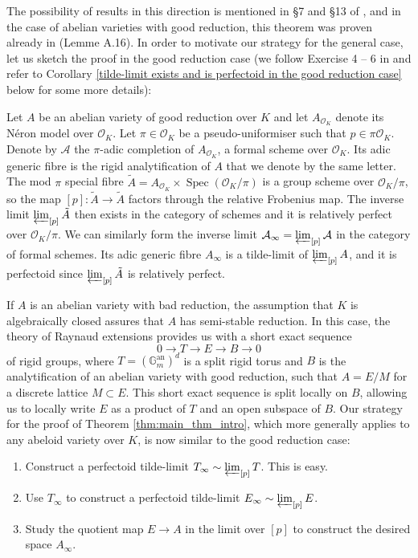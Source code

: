 \documentclass[10pt,oneside]{amsart}
\theoremstyle{definition}
\newcommand{\Spec}{\operatorname{Spec}}
\renewcommand{\O}{\mathcal{O}}
\begin{document}
The possibility of results in this direction is mentioned in \S 7 and \S 13 of \cite{scholzeICMproceedings}, and in the case of abelian varieties with good reduction, this theorem was proven already in \cite{Pilloni-Stroh} (Lemme A.16).  In order to motivate our strategy for the general case, let us sketch the proof in the good reduction case (we follow Exercise 4 -- 6 in \cite{Bhatt} and refer to Corollary \ref{tilde-limit exists and is perfectoid in the good reduction case} below for some more details):

Let $A$ be an abelian variety of good reduction over $K$ and let $A_{\mathcal O_K}$ denote its N\'eron model over $\mathcal O_K$. Let $\pi\in\mathcal O_K$ be a pseudo-uniformiser such that $p\in \pi\mathcal O_K$. Denote by $\mathcal A$ the $\pi$-adic completion of $A_{\mathcal O_K}$, a formal scheme over $\mathcal O_K$. Its adic generic fibre is the rigid analytification of $A$ that we denote by the same letter. The mod $\pi$ special fibre $\tilde{A} = A_{\mathcal O_K}\times \Spec(\O_K/\pi)$ is a group scheme over $\mathcal O_K/\pi$, so the map $[p]\colon\tilde{A}\rightarrow \tilde{A}$ factors through the relative Frobenius map. The inverse limit $ \varprojlim_{[p]} \tilde{A} $ then exists in the category of schemes and it is relatively perfect over $\mathcal O_K/\pi$. We can similarly form the inverse limit $\mathcal A_{\infty} = \varprojlim_{[p]} \mathcal A$ in the category of formal schemes. Its adic generic fibre $A_\infty$ is a tilde-limit of $\varprojlim_{[p]}A$, and it is perfectoid since $ \varprojlim_{[p]} \tilde{A} $ is relatively perfect.

If $A$ is an abelian variety with bad reduction, the assumption that $K$ is algebraically closed assures that $A$ has semi-stable reduction.
In this case, the theory of Raynaud extensions provides us with a short exact sequence 
\[ 0 \rightarrow T \rightarrow E  \rightarrow  B  \rightarrow  0\]
of rigid groups, where $T = (\mathbb G_m^{\text{an}})^{d}$ is a split rigid torus and $B$ is the analytification of an abelian variety with good reduction, such that $A = E/M$ for a discrete lattice $M \subset E$. This short exact sequence is split locally on $B$, allowing us to locally write $E$ as a product of $T$ and an open subspace of $B$.
Our strategy for the proof of Theorem \ref{thm:main_thm_intro}, which more generally applies to any abeloid variety over $K$, is now similar to the good reduction case:
\begin{enumerate}
\item Construct a perfectoid tilde-limit $T_\infty\sim\varprojlim_{[p]} T$. This is easy.
\item Use $T_\infty$ to construct a perfectoid tilde-limit $E_\infty\sim\varprojlim_{[p]} E$.
\item Study the quotient map $E\rightarrow A$ in the limit over $[p]$ to construct the desired space $A_\infty$.
\end{enumerate}
\end{document}
